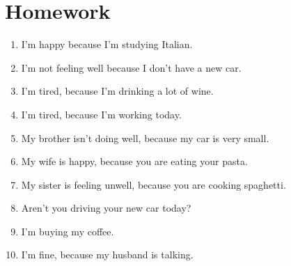 \section{Homework} \label{0131-Homework}
\begin{enumerate}
    \item I'm happy because I'm studying Italian. \\
    \item I'm not feeling well because I don't have a new car. \\
    \item I'm tired, because I'm drinking a lot of wine. \\
    \item I'm tired, because I'm working today. \\
    \item My brother isn't doing well, because my car is very small. \\
    \item My wife is happy, because you are eating your pasta. \\
    \item My sister is feeling unwell, because you are cooking spaghetti. \\
    \item Aren't you driving your new car today? \\
    \item I'm buying my coffee. \\
    \item I'm fine, because my husband is talking. \\
\end{enumerate}
